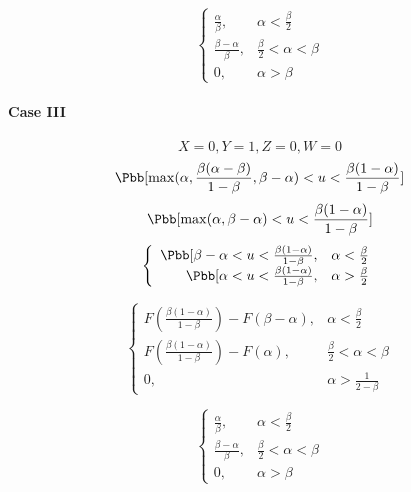 \begin{displaymath}
\left\{\begin{array}{rl}
\frac{\alpha}{\beta}, & \alpha < \frac{\beta}{2}\\
\frac{\beta-\alpha}{\beta}, & \frac{\beta}{2} < \alpha < \beta\\
0, & \alpha > \beta
\end{array}\right.
\end{displaymath}



\paragraph{Case III}
\[X = 0, Y = 1, Z = 0, W = 0\]
\[\Pbb[\max(\alpha,\frac{\beta(\alpha - \beta)}{1-\beta}, \beta-\alpha)< u < \frac{\beta(1-\alpha)}{1-\beta}]\]
\[\Pbb[\max(\alpha, \beta-\alpha)< u < \frac{\beta(1-\alpha)}{1-\beta}]\]
\begin{displaymath}
\left\{\begin{array}{rl}
\Pbb[\beta-\alpha < u < \frac{\beta(1-\alpha)}{1-\beta}, & \alpha < \frac{\beta}{2}\\
\Pbb[\alpha < u < \frac{\beta(1-\alpha)}{1-\beta}, & \alpha > \frac{\beta}{2}
\end{array}\right.
\end{displaymath}

\begin{displaymath}
\left\{\begin{array}{rl}
F(\frac{\beta(1-\alpha)}{1-\beta}) - F(\beta - \alpha), & \alpha < \frac{\beta}{2}\\
F(\frac{\beta(1-\alpha)}{1-\beta}) - F(\alpha), & \frac{\beta}{2} < \alpha < \beta\\
0, & \alpha > \frac{1}{2-\beta}
\end{array}\right.
\end{displaymath}

\begin{displaymath}
\left\{\begin{array}{rl}
\frac{\alpha}{\beta}, & \alpha < \frac{\beta}{2}\\
\frac{\beta-\alpha}{\beta}, & \frac{\beta}{2} < \alpha < \beta\\
0, & \alpha > \beta
\end{array}\right.
\end{displaymath}

